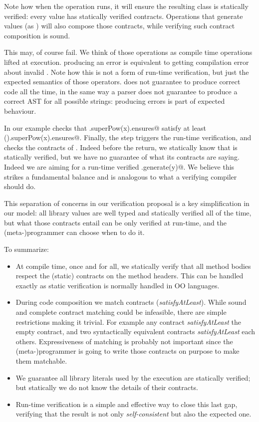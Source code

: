 Note how when the \Q@Override@ operation  runs, it will
ensure the resulting class is statically verified:
every \Q@Library@ value has statically verified contracts. Operations 
that generate \Q@Library@ values (as \Q@Override@) will also compose those contracts, while verifying such
contract composition is sound.

This may, of course fail.
We think of those operations as compile time operations lifted at execution.
\Q@Override@ producing an error is  equivalent to
getting compilation error about invalid \Q@extends@.
Note how this is not a form of run-time verification, but just the expected semantics of those operators.
\Q@Override@ does not guarantee to produce correct code all the time, in the same way a parser does not guarantee to produce a correct AST for all possible strings: producing errors is part of \Q@Override@ expected behaviour.

In our example \Q@Override@ checks that \Q@res.superPow(x).ensures@
 satisfy at least \Q@inductive().superPow(x).ensures@.
Finally, the \Q@return@ step triggers the run-time verification, and
checks the contracts of \Q@res@.
Indeed before the return, we statically know that \Q@res@ is statically verified,
 but we have no guarantee of what its contracts are saying.
Indeed we are aiming for a run-time verified \Q@Pow.generate(y)@.
We believe this strikes a fundamental balance and is analogous to what a
verifying compiler~\cite{hoare2003verifying} should do.

This separation of concerns in our verification proposal is a key simplification
in our model:
all library values are well typed and statically verified all of the time,
but what those contracts entail can be only verified at run-time, and
the (meta-)programmer can choose when to do it.




To summarize:
\begin{itemize}
\item
At compile time, once and for all, we statically verify that all
method bodies respect the (static) contracts on the method headers.
This can be handled exactly as static verification is normally handled in OO languages.
\item
During code composition we match contracts (\emph{satisfyAtLeast}).
While sound and complete contract matching could be infeasible, 
there are simple restrictions making it trivial.
For example any contract \emph{satisfyAtLeast} the empty contract,
and two syntactically equivalent contracts \emph{satisfyAtLeast} each others.
Expressiveness of matching is probably not important since the (meta-)programmer
is going to write those contracts on purpose to make them matchable.
\item
We guarantee all library literals used by the execution are statically verified; but
statically we do not know the details of their contracts.
\item
Run-time verification is a simple and effective way to close this last gap, verifying
that the result is not only \emph{self-consistent} but also the expected one.
\end{itemize}


